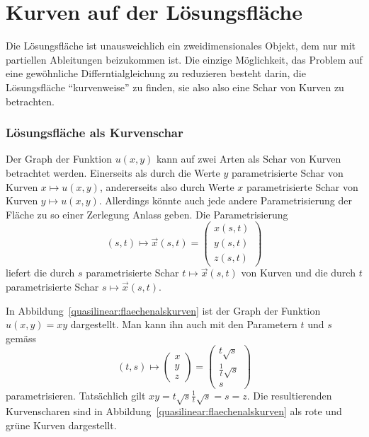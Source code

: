 \section{Kurven auf der Lösungsfläche}
Die Lösungsfläche ist unausweichlich ein zweidimensionales
Objekt, dem nur mit partiellen Ableitungen beizukommen ist.
Die einzige Möglichkeit, das Problem auf eine gewöhnliche
Differntialgleichung zu reduzieren besteht darin, die Lösungsfläche
``kurvenweise'' zu finden, sie also also eine Schar von Kurven
zu betrachten.

\subsubsection{Lösungsfläche als Kurvenschar}
Der Graph der Funktion $u(x,y)$ kann auf zwei Arten als Schar von
Kurven betrachtet werden.
Einerseits als durch die Werte $y$
parametrisierte Schar von Kurven $x\mapsto u(x,y)$, andererseits
also durch Werte $x$ parametrisierte Schar von Kurven $y\mapsto u(x,y)$.
Allerdings könnte auch jede andere Parametrisierung der Fläche
zu so einer Zerlegung Anlass geben. Die Parametrisierung
\begin{equation}
(s,t)\mapsto \vec x(s,t)
=
\begin{pmatrix}x(s,t)\\y(s,t)\\z(s,t)\end{pmatrix}
\label{quasilinear:kurvenschar}
\end{equation}
liefert die durch $s$ parametrisierte Schar $t\mapsto \vec x(s,t)$
von Kurven und die durch $t$ parametrisierte Schar $s\mapsto\vec x(s,t)$.

In Abbildung~\ref{quasilinear:flaechenalskurven} ist der Graph der
Funktion $u(x,y)=xy$ dargestellt.
Man kann ihn auch mit den Parametern $t$ und $s$ gemäss
\begin{equation}
(t,s)
\mapsto
\begin{pmatrix}x\\y\\z\end{pmatrix}
=
\begin{pmatrix}t\sqrt{s}\\\frac1t\sqrt{s}\\s\end{pmatrix}
\label{quasliniear:flaechebeispiel}
\end{equation}
parametrisieren.
Tatsächlich gilt $xy = t\sqrt{s}\frac1t\sqrt{s}=s=z$.
Die resultierenden Kurvenscharen sind in
Abbildung~\ref{quasilinear:flaechenalskurven} als rote und grüne Kurven
dargestellt.

